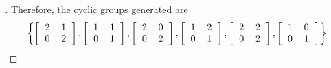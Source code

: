\documentclass[paper=usletter, fontsize=12pt]{article}
\begin{document}
\begin{itemize}
\begin{itemize}
\begin{proof}[\unskip\nopunct]
                Therefore, the cyclic groups generated are
                \begingroup
                \addtolength{\jot}{1em}
                \begin{equation*}
                    \left\{
                        \left[
                            \begin{tabular}{cc}
                                2 & 1 \\
                                0 & 2
                            \end{tabular}
                        \right],
                        \left[
                            \begin{tabular}{cc}
                                1 & 1 \\
                                0 & 1
                            \end{tabular}
                        \right],
                        \left[
                            \begin{tabular}{cc}
                                2 & 0 \\
                                0 & 2
                            \end{tabular}
                        \right],
                        \left[
                            \begin{tabular}{cc}
                                1 & 2 \\
                                0 & 1
                            \end{tabular}
                        \right],
                        \left[
                            \begin{tabular}{cc}
                                2 & 2 \\
                                0 & 2
                            \end{tabular}
                        \right],
                        \left[
                            \begin{tabular}{cc}
                                1 & 0 \\
                                0 & 1
                            \end{tabular}
                        \right]
                    \right\} \qedhere
                \end{equation*}
                \endgroup

            \end{proof}
            \vspace{0.2in}


\end{itemize}
\end{itemize}
\end{document}
